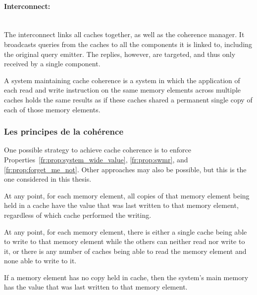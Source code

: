 \paragraph{Interconnect:}~~\\
The interconnect links all caches together, as well as the coherence manager.
It broadcasts queries from the caches to all the components it is linked to,
including the original query emitter. The replies, however, are targeted, and
thus only received by a single component.

A system maintaining cache coherence is a system in which the application of
each read and write instruction on the same memory elements across multiple
caches holds the same results as if these caches shared a permanent single copy
of each of those memory elements.

\subsubsection{Les principes de la coh\'erence}
One possible strategy to achieve cache coherence is to enforce
Properties~\ref{fr:prop:system_wide_value}, \ref{fr:prop:swmr}, and
\ref{fr:prop:forget_me_not}. Other approaches may also be possible, but this is
the one considered in this thesis.

\begin{property}%
\label{fr:prop:system_wide_value}
At any point, for each memory element, all copies of that memory element being
held in a cache have the value that was last written to that memory element,
regardless of which cache performed the writing.
\end{property}

\begin{property}%
\label{fr:prop:swmr}
At any point, for each memory element, there is either a single cache being
able to write to that memory element while the others can neither read nor
write to it, or there is any number of caches being able to read the memory
element and none able to write to it.
\end{property}

\begin{property}%
\label{fr:prop:forget_me_not}
If a memory element has no copy held in cache, then the system's main memory
has the value that was last written to that memory element.
\end{property}

